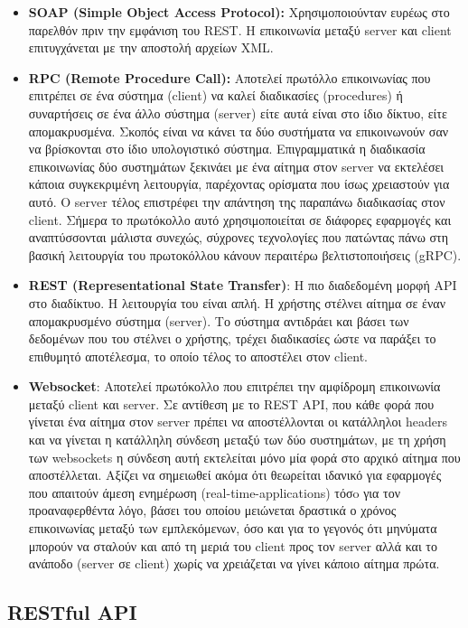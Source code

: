 \begin{itemize}
	\item \textbf{SOAP (Simple Object Access Protocol):} Χρησιμοποιούνταν ευρέως στο παρελθόν πριν την εμφάνιση του REST.
		Η επικοινωνία μεταξύ server και client επιτυγχάνεται με την αποστολή αρχείων XML.
	\item \textbf{RPC (Remote Procedure Call):} Αποτελεί πρωτόλλο επικοινωνίας που επιτρέπει σε ένα σύστημα (client) να καλεί διαδικασίες (procedures)
		ή συναρτήσεις σε ένα άλλο σύστημα (server) είτε αυτά είναι στο ίδιο δίκτυο, είτε απομακρυσμένα. Σκοπός είναι να
		κάνει τα δύο συστήματα να επικοινωνούν σαν να βρίσκονται στο ίδιο υπολογιστικό σύστημα. Επιγραμματικά η διαδικασία
		επικοινωνίας δύο συστημάτων ξεκινάει με ένα αίτημα στον server να εκτελέσει κάποια συγκεκριμένη λειτουργία, παρέχοντας
		ορίσματα που ίσως χρειαστούν για αυτό. Ο server τέλος επιστρέφει την απάντηση της παραπάνω διαδικασίας στον client. Σήμερα το πρωτόκολλο αυτό
		χρησιμοποιείται σε διάφορες εφαρμογές και αναπτύσσονται μάλιστα συνεχώς, σύχρονες τεχνολογίες που πατώντας πάνω στη βασική λειτουργία
		του πρωτοκόλλου κάνουν περαιτέρω βελτιστοποιήσεις (gRPC).
	\item \textbf{REST (Representational State Transfer)}: Η πιο διαδεδομένη μορφή API στο διαδίκτυο. Η λειτουργία του είναι απλή. Η χρήστης στέλνει αίτημα σε έναν
		απομακρυσμένο σύστημα (server). Το σύστημα αντιδράει και βάσει των δεδομένων που του στέλνει ο χρήστης, τρέχει διαδικασίες ώστε να παράξει το
		επιθυμητό αποτέλεσμα, το οποίο τέλος το αποστέλει στον client.
	\item \textbf{Websocket}: Αποτελεί πρωτόκολλο που επιτρέπει την αμφίδρομη επικοινωνία μεταξύ client και server. Σε αντίθεση με το REST API, που κάθε φορά
		που γίνεται ένα αίτημα στον server πρέπει να αποστέλλονται οι κατάλληλοι headers και να γίνεται η κατάλληλη σύνδεση μεταξύ των δύο συστημάτων, με τη χρήση των websockets
		η σύνδεση αυτή εκτελείται μόνο μία φορά στο αρχικό αίτημα που αποστέλλεται. Αξίζει να σημειωθεί ακόμα ότι θεωρείται ιδανικό για εφαρμογές που απαιτούν άμεση ενημέρωση \cite{websockets} (real-time-applications)
		τόσo για τον προαναφερθέντα λόγο, βάσει του οποίου μειώνεται δραστικά ο χρόνος επικοινωνίας μεταξύ των εμπλεκόμενων, όσο και για το γεγονός ότι
		μηνύματα μπορούν να σταλούν και από τη μεριά του client προς τον server αλλά και το ανάποδο (server σε client) χωρίς να χρειάζεται να γίνει κάποιο αίτημα πρώτα.
\end{itemize}

\subsection{RESTful API}
\label{subsec:rest_api}

